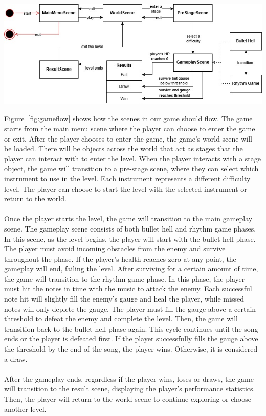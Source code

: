 \vspace{0.5cm}

\noindent
\begin{minipage}{\columnwidth}
    \centering
    \includegraphics[width=\columnwidth, keepaspectratio]{images/gameflow}
    \label{fig:gameflow}
\end{minipage}

\vspace{0.5cm}

\noindent Figure~\ref{fig:gameflow} shows how the scenes in our game should flow.
The game starts from the main menu scene where the player can choose to enter the game or exit.
After the player chooses to enter the game, the game's world scene will be loaded.
There will be objects across the world that act as stages that the player can interact with to
enter the level.
When the player interacts with a stage object, the game will transition to a pre-stage scene, where
they can select which instrument to use in the level.
Each instrument represents a different difficulty level.
The player can choose to start the level with the selected instrument or return to the world.
\\\\
Once the player starts the level, the game will transition to the main gameplay scene.
The gameplay scene consists of both bullet hell and rhythm game phases.
In this scene, as the level begins, the player will start with the bullet hell phase.
The player must avoid incoming obstacles from the enemy and survive throughout the phase.
If the player's health reaches zero at any point, the gameplay will end, failing the level.
After surviving for a certain amount of time, the game will transition to the rhythm game phase.
In this phase, the player must hit the notes in time with the music to attack the enemy.
Each successful note hit will slightly fill the enemy's gauge and heal the player, while missed notes will 
only deplete the gauge.
The player must fill the gauge above a certain threshold to defeat the enemy and complete the level.
Then, the game will transition back to the bullet hell phase again.
This cycle continues until the song ends or the player is defeated first.
If the player successfully fills the gauge above the threshold by the end of the song, the player wins.
Otherwise, it is considered a draw.
\\\\
After the gameplay ends, regardless if the player wins, loses or draws, the game will transition to the result
scene, displaying the player's performance statistics.
Then, the player will return to the world scene to continue exploring or choose another level.